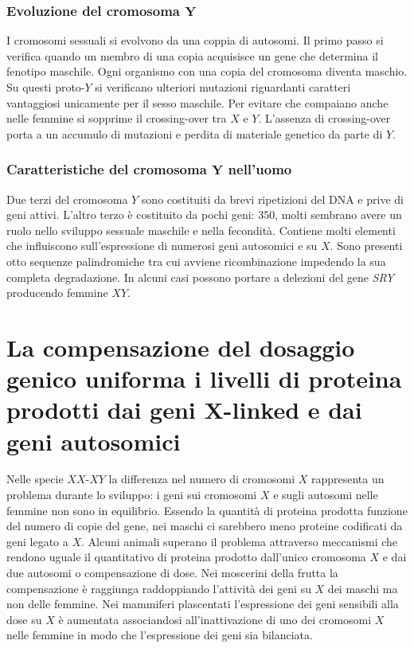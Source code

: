 		\subsubsection{Evoluzione del cromosoma $\mathbf{Y}$}
		I cromosomi sessuali si evolvono da una coppia di autosomi.
		Il primo passo si verifica quando un membro di una copia acquisisce un gene che determina il fenotipo maschile.
		Ogni organismo con una copia del cromosoma diventa maschio.
		Su questi proto-$Y$ si verificano ulteriori mutazioni riguardanti caratteri vantaggiosi unicamente per il sesso maschile.
		Per evitare che compaiano anche nelle femmine si sopprime il crossing-over tra $X$ e $Y$.
		L'assenza di crossing-over porta a un accumulo di mutazioni e perdita di materiale genetico da parte di $Y$.

		\subsubsection{Caratteristiche del cromosoma $\mathbf{Y}$ nell'uomo}
		Due terzi del cromosoma $Y$ sono costituiti da brevi ripetizioni del DNA e prive di geni attivi.
		L'altro terzo \`e costituito da pochi geni: $350$, molti sembrano avere un ruolo nello sviluppo sessuale maschile e nella fecondit\`a.
		Contiene molti elementi che influiscono sull'espressione di numerosi geni autosomici e su $X$.
		Sono presenti otto sequenze palindromiche tra cui avviene ricombinazione impedendo la sua completa degradazione.
		In alcuni casi possono portare a delezioni del gene \emph{SRY} producendo femmine $XY$.

\section{La compensazione del dosaggio genico uniforma i livelli di proteina prodotti dai geni $\mathbf{X}$-linked e dai geni autosomici}
Nelle specie $XX$-$XY$ la differenza nel numero di cromosomi $X$ rappresenta un problema durante lo sviluppo: i geni sui cromosomi $X$ e sugli autosomi nelle femmine non sono in equilibrio.
Essendo la quantit\`a di proteina prodotta funzione del numero di copie del gene, nei maschi ci sarebbero meno proteine codificati da geni legato a $X$.
Alcuni animali superano il problema attraverso meccanismi che rendono uguale il quantitativo di proteina prodotto dall'unico cromosoma $X$ e dai due autosomi o compensazione di dose.
Nei moscerini della frutta la compensazione \`e raggiunga raddoppiando l'attivit\`a dei geni su $X$ dei maschi ma non delle femmine.
Nei mammiferi plascentati l'espressione dei geni sensibili alla dose su $X$ \`e aumentata associandosi all'inattivazione di uno dei cromosomi $X$ nelle femmine in modo che l'espressione dei geni sia bilanciata.

